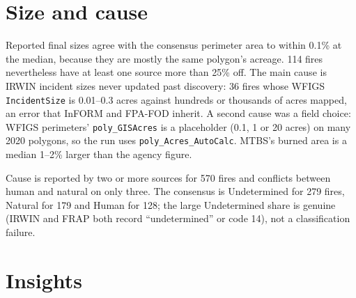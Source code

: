 \documentclass[11pt,a4paper]{article}
\begin{document}
\section{Size and cause}

Reported final sizes agree with the consensus perimeter area to within 0.1\% at the median, because they are
mostly the same polygon's acreage. 114 fires nevertheless have at least one source more than 25\% off. The main
cause is IRWIN incident sizes never updated past discovery: 36 fires whose WFIGS \texttt{IncidentSize} is
0.01--0.3 acres against hundreds or thousands of acres mapped, an error that InFORM and FPA-FOD inherit. A
second cause was a field choice: WFIGS perimeters' \texttt{poly\_GISAcres} is a placeholder (0.1, 1 or 20 acres)
on many 2020 polygons, so the run uses \texttt{poly\_Acres\_AutoCalc}. MTBS's burned area is a median 1--2\%
larger than the agency figure.

Cause is reported by two or more sources for 570 fires and conflicts between human and natural on only three.
The consensus is Undetermined for 279 fires, Natural for 179 and Human for 128; the large Undetermined share is
genuine (IRWIN and FRAP both record ``undetermined'' or code 14), not a classification failure.

\section{Insights}
\end{document}
